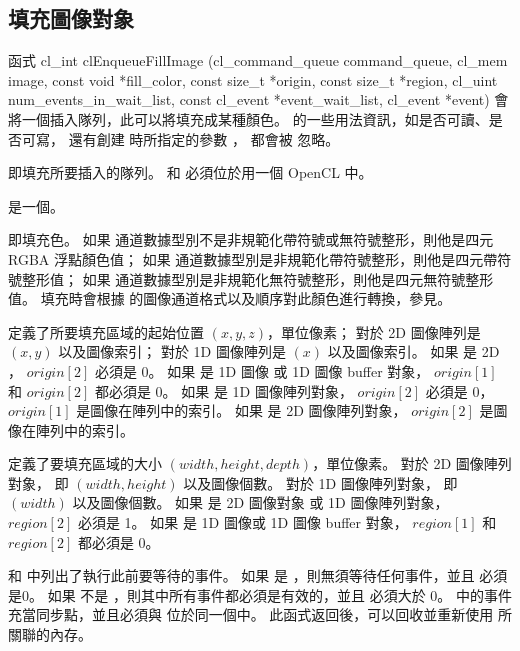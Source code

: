 \subsection{填充圖像對象}

函式
\startCLFUNC
cl_int clEnqueueFillImage (cl_command_queue command_queue,
			cl_mem image,
			const void *fill_color,
			const size_t *origin,
			const size_t *region,
			cl_uint num_events_in_wait_list,
			const cl_event *event_wait_list,
			cl_event *event)
\stopCLFUNC
會將一個插入隊列，此可以將填充成某種顏色。
  的一些用法資訊，如是否可讀、是否可寫，
還有創建  時所指定的參數 ，
都會被  忽略。

 即填充所要插入的隊列。
 和  必須位於用一個 OpenCL 中。

 是一個。

 即填充色。
如果  通道數據型別不是非規範化帶符號或無符號整形，則他是四元 RGBA 浮點顏色值；
如果  通道數據型別是非規範化帶符號整形，則他是四元帶符號整形值；
如果  通道數據型別是非規範化無符號整形，則他是四元無符號整形值。
填充時會根據  的圖像通道格式以及順序對此顏色進行轉換，參見。

 定義了所要填充區域的起始位置 $(x, y, z)$，單位像素；
對於 2D 圖像陣列是 $(x, y)$ 以及圖像索引；
對於 1D 圖像陣列是 $(x)$ 以及圖像索引。
如果  是 2D ， $origin[2]$ 必須是 0。
如果  是 1D 圖像 或 1D 圖像 buffer 對象， $origin[1]$ 和 $origin[2]$ 都必須是 0。
如果  是 1D 圖像陣列對象， $origin[2]$ 必須是 0， $origin[1]$ 是圖像在陣列中的索引。
如果  是 2D 圖像陣列對象， $origin[2]$ 是圖像在陣列中的索引。

 定義了要填充區域的大小 $(width, height, depth)$，單位像素。
對於 2D 圖像陣列對象， 即 $(width, height)$ 以及圖像個數。
對於 1D 圖像陣列對象， 即 $(width)$ 以及圖像個數。
如果  是 2D 圖像對象 或 1D 圖像陣列對象， $region[2]$ 必須是 1。
如果  是 1D 圖像或 1D 圖像 buffer 對象， $region[1]$ 和 $region[2]$ 都必須是 0。

 和  中列出了執行此前要等待的事件。
如果  是 ，則無須等待任何事件，並且  必須是0。
如果  不是 ，則其中所有事件都必須是有效的，並且  必須大於 0。
 中的事件充當同步點，並且必須與  位於同一個中。
此函式返回後，可以回收並重新使用  所關聯的內存。


